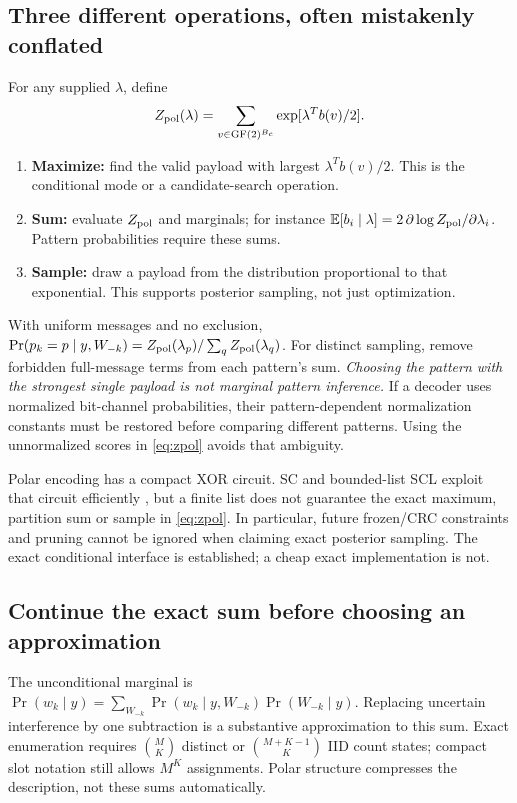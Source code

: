 \documentclass[10pt,a4paper]{article}
\newcommand{\E}{\mathbb E}
\newcommand{\GF}{\operatorname{GF}}
\begin{document}
\subsection{Three different operations, often mistakenly conflated}
For any supplied $\lambda$, define
\begin{equation}
 Z_{\rm pol}(\lambda)=\sum_{v\in\GF(2)^{B_c}}\exp[\lambda^Tb(v)/2].
 \label{eq:zpol}
\end{equation}
\begin{enumerate}
\item \textbf{Maximize:} find the valid payload with largest $\lambda^Tb(v)/2$.
      This is the conditional mode or a candidate-search operation.
\item \textbf{Sum:} evaluate $Z_{\rm pol}$ and marginals; for instance
      $\E[b_i\mid\lambda]=2\,\partial\log Z_{\rm pol}/\partial\lambda_i$.
      Pattern probabilities require these sums.
\item \textbf{Sample:} draw a payload from the distribution proportional to that exponential.
      This supports posterior sampling, not just optimization.
\end{enumerate}
With uniform messages and no exclusion, $\Pr(p_k=p\mid y,W_{-k})=Z_{\rm pol}(\lambda_p)/\sum_qZ_{\rm pol}(\lambda_q)$.
For distinct sampling, remove forbidden full-message terms from each pattern's sum.
\emph{Choosing the pattern with the strongest single payload is not marginal pattern inference.}
If a decoder uses normalized bit-channel probabilities, their pattern-dependent normalization constants must be
restored before comparing different patterns. Using the unnormalized scores in \eqref{eq:zpol} avoids that ambiguity.

Polar encoding has a compact XOR circuit. SC and bounded-list SCL exploit that circuit efficiently
\cite{arikan,tal}, but a finite list does not guarantee the exact maximum, partition sum or sample in
\eqref{eq:zpol}. In particular, future frozen/CRC constraints and pruning cannot be ignored when claiming exact
posterior sampling. The exact conditional interface is established; a cheap exact implementation is not.

\subsection{Continue the exact sum before choosing an approximation}
The unconditional marginal is
$\Pr(w_k\mid y)=\sum_{W_{-k}}\Pr(w_k\mid y,W_{-k})\Pr(W_{-k}\mid y)$.
Replacing uncertain interference by one subtraction is a substantive approximation to this sum.
Exact enumeration requires $\binom{M}{K}$ distinct or $\binom{M+K-1}{K}$ IID count states; compact slot notation still
allows $M^K$ assignments. Polar structure compresses the description, not these sums automatically.
\end{document}
